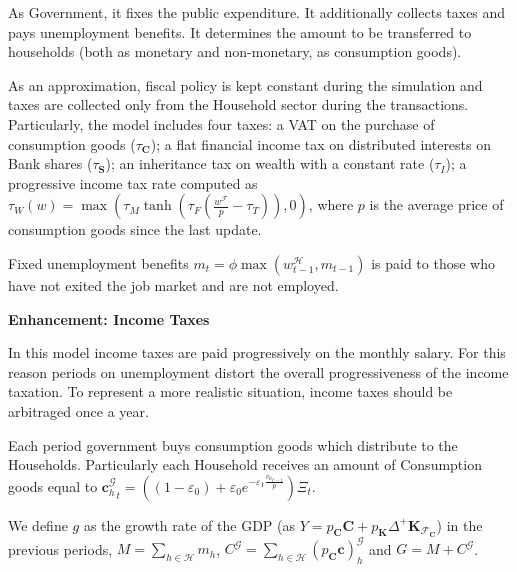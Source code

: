 \documentclass[a4paper, headings=standardclasses]{scrartcl}
\numberwithin{equation}{subsection}
\newenvironment{enh}[1][]{\begin{framed}\noindent\textbf{Enhancement: #1}\par}{\end{framed}}
\begin{document}
As Government, it fixes the public expenditure. It additionally collects taxes and pays unemployment benefits. It determines the amount to be transferred to households (both as monetary and non-monetary, as consumption goods).

As an approximation, fiscal policy is kept constant during the simulation and taxes are collected only from the Household sector during the transactions. Particularly, the model includes four taxes: a VAT on the purchase of consumption goods ($\tau_\mathbf{C}$); a flat financial income tax on distributed interests on Bank shares ($\tau_\mathbf{S}$); an inheritance tax on wealth with a constant rate ($\tau_I$); a progressive income tax rate computed as $\tau_W(w) = \max(\tau_M \tanh(\tau_F (\frac{w^\mathcal{F}}{p} - \tau_T)),0)$, where $p$ is the average price of consumption goods since the last update. %

Fixed unemployment benefits $m_{t} = \phi \max(w^\mathcal{H}_{t-1}, m_{t-1})$ is paid to those who have not exited the job market and are not employed.

\begin{enh}[Income Taxes]
    In this model income taxes are paid progressively on the monthly salary. For this reason periods on unemployment distort the overall progressiveness of the income taxation. To represent a more realistic situation, income taxes should be arbitraged once a year.
\end{enh}

Each period government buys consumption goods which distribute to the Households. Particularly each Household receives an amount of Consumption goods equal to ${\mathbf{c}^\mathcal{G}_h}_t = ((1 - \varepsilon_0) + \varepsilon_0 e^{-\varepsilon_1\frac{{v_h}_{t-1}}{p}})\Xi_t$.

We define $g$ as the growth rate of the GDP (as $Y = p_\mathbf{C}\mathbf{C} + p_\mathbf{K}\Delta^+\mathbf{K}_{\mathcal{F}_\mathbf{C}}$) %
in the previous periods, $M = \sum_{h \in \mathcal{H}} m_h$, $C^\mathcal{G}= \sum_{h \in \mathcal{H}} (p_\mathbf{C} \mathbf{c})^\mathcal{G}_h$ and $G = M + C^\mathcal{G}$.
\end{document}
